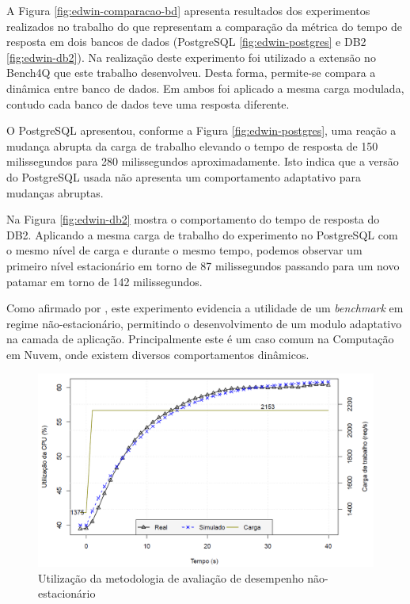 A Figura \ref{fig:edwin-comparacao-bd} apresenta resultados dos experimentos realizados no trabalho do  que representam a comparação da métrica do tempo de resposta em dois bancos de dados (PostgreSQL \ref{fig:edwin-postgres} e DB2 \ref{fig:edwin-db2}). Na realização deste experimento foi utilizado a extensão no Bench4Q que este trabalho desenvolveu. Desta forma, permite-se compara a dinâmica entre banco de dados. Em ambos foi aplicado a mesma carga modulada, contudo cada banco de dados teve uma resposta diferente. 

O PostgreSQL apresentou, conforme a Figura \ref{fig:edwin-postgres}, uma reação a mudança abrupta da carga de trabalho elevando o tempo de resposta de 150 milissegundos para 280 milissegundos aproximadamente. Isto indica que a versão do PostgreSQL usada não apresenta um comportamento adaptativo para mudanças abruptas. 

Na Figura \ref{fig:edwin-db2} mostra o comportamento do tempo de resposta do DB2. Aplicando a mesma carga de trabalho do experimento no PostgreSQL com o mesmo nível de carga e durante o mesmo tempo, podemos observar um primeiro nível estacionário em torno de 87 milissegundos passando para um novo patamar em torno de 142 milissegundos.

Como afirmado por , este experimento evidencia a utilidade de um \textit{benchmark} em regime não-estacionário, permitindo o desenvolvimento de um modulo adaptativo na camada de aplicação. Principalmente este é um caso comum na Computação em Nuvem, onde existem diversos comportamentos dinâmicos.

\begin{figure}[htb]
	\centering
	\includegraphics[scale=0.6]{../../apresentation/images/resultado_edwin_identificao_sys.png}
	\caption{Utilização da metodologia de avaliação de desempenho não-estacionário}
	\label{fig:edwin-identificao}
\end{figure}

